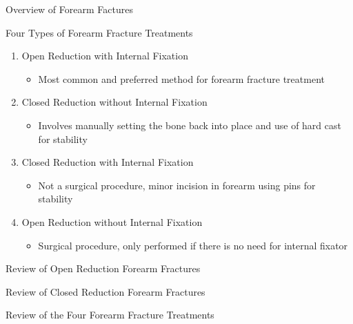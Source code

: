 \documentclass[
  ignorenonframetext,
]{beamer}
\providecommand{\tightlist}{%
  \setlength{\itemsep}{0pt}\setlength{\parskip}{0pt}}
\begin{document}
\begin{frame}{ Overview of Forearm Factures }
\protect\hypertarget{overview-of-forearm-factures}{}

\begin{block}{Four Types of Forearm Fracture Treatments}

\begin{enumerate}
\tightlist
\item
  Open Reduction with Internal Fixation

  \begin{itemize}
  \tightlist
  \item
    Most common and preferred method for forearm fracture treatment
  \end{itemize}
\item
  Closed Reduction without Internal Fixation

  \begin{itemize}
  \tightlist
  \item
    Involves manually setting the bone back into place and use of hard
    cast for stability
  \end{itemize}
\item
  Closed Reduction with Internal Fixation

  \begin{itemize}
  \tightlist
  \item
    Not a surgical procedure, minor incision in forearm using pins for
    stability
  \end{itemize}
\item
  Open Reduction without Internal Fixation

  \begin{itemize}
  \tightlist
  \item
    Surgical procedure, only performed if there is no need for internal
    fixator
  \end{itemize}
\end{enumerate}

\end{block}

\begin{block}{Review of Open Reduction Forearm Fractures}

\end{block}

\begin{block}{Review of Closed Reduction Forearm Fractures}

\end{block}

\begin{block}{Review of the Four Forearm Fracture Treatments}


\end{block}
\end{frame}
\end{document}
